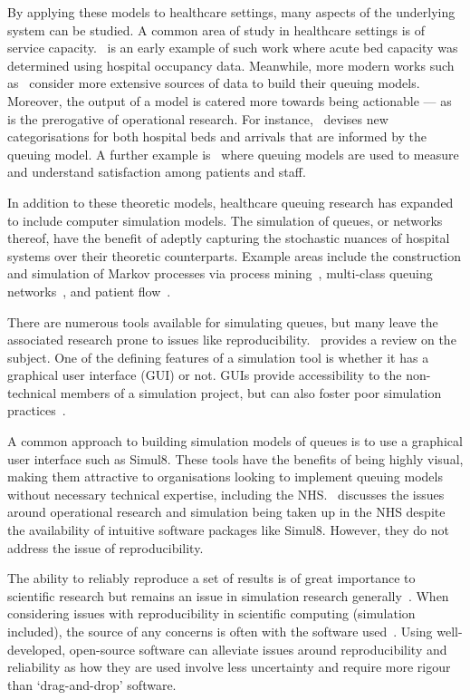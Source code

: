 \documentclass[]{interact}
\theoremstyle{plain}%
\theoremstyle{definition}
\theoremstyle{remark}
\begin{document}
By applying these models to healthcare settings, many aspects of the underlying
system can be studied. A common area of study in healthcare settings is of
service capacity.~\cite{McClain1976} is an early example of such work where
acute bed capacity was determined using hospital occupancy data. Meanwhile, more
modern works such as~\cite{Bittencourt2018,Palvannan2012,Pinto2014} consider
more extensive sources of data to build their queuing models. Moreover, the
output of a model is catered more towards being actionable --- as is the
prerogative of operational research. For instance,~\cite{Pinto2014} devises new
categorisations for both hospital beds and arrivals that are informed by the
queuing model. A further example is~\cite{Komashie2015} where queuing models are
used to measure and understand satisfaction among patients and staff.

In addition to these theoretic models, healthcare queuing research has expanded
to include computer simulation models. The simulation of queues, or networks
thereof, have the benefit of adeptly capturing the stochastic nuances of
hospital systems over their theoretic counterparts. Example areas include the
construction and simulation of Markov processes via process
mining~\citep{Arnolds2018,Rebuge2012}, multi-class queuing
networks~\citep{Cochran2009}, and patient flow~\citep{Bhattacharjee2014}.

There are numerous tools available for simulating queues, but many leave the
associated research prone to issues like reproducibility.~\cite{Dagkakis2016}
provides a review on the subject. One of the defining features of a simulation
tool is whether it has a graphical user interface (GUI) or not. GUIs provide
accessibility to the non-technical members of a simulation project, but can also
foster poor simulation practices~\citep{Bell1987}.

A common approach to building simulation models of queues is to use a graphical
user interface such as Simul8. These tools have the benefits of being highly
visual, making them attractive to organisations looking to implement queuing
models without necessary technical expertise, including the
NHS.~\cite{Brailsford2013} discusses the issues around operational research and
simulation being taken up in the NHS despite the availability of intuitive
software packages like Simul8. However, they do not address the issue of
reproducibility.

The ability to reliably reproduce a set of results is of great importance to
scientific research but remains an issue in simulation research
generally~\citep{Fitzpatrick2019}. When considering issues with reproducibility
in scientific computing (simulation included), the source of any concerns is
often with the software used~\citep{Ivie2018}. Using well-developed, open-source
software can alleviate issues around reproducibility and reliability as how they
are used involve less uncertainty and require more rigour than `drag-and-drop'
software.
\end{document}

